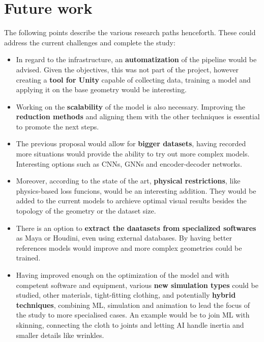 \section*{Future work}
The following points describe the various research paths henceforth. These could address the current challenges and complete the study:
\begin{itemize}
    \item In regard to the infrastructure, an \textbf{automatization} of the pipeline would be advised. Given the objectives, this was not part of the project, however creating a \textbf{tool for Unity} capable of collecting data, training a model and applying it on the base geometry would be interesting.
    \item Working on the \textbf{scalability} of the model is also necessary. Improving the \textbf{reduction methods} and aligning them with the other techniques is essential to promote the next steps.
    \item The previous proposal would allow for \textbf{bigger datasets}, having recorded more situations would provide the ability to try out more complex models. Interesting options such as CNNs, GNNs and encoder-decoder networks.
    \item Moreover, according to the state of the art, \textbf{physical restrictions}, like physics-based loss funcions, would be an interesting addition. They would be added to the current models to archieve optimal visual results besides the topology of the geometry or the dataset size.
    \item There is an option to \textbf{extract the daatasets from specialized softwares} as Maya or Houdini, even using external databases. By having better references models would improve and more complex geometries could be trained.
    \item Having improved enough on the optimization of the model and with competent software and equipment, various \textbf{new simulation types} could be studied, other materials, tight-fitting clothing, and potentially \textbf{hybrid techniques}, combining ML, simulation and animation to lead the focus of the study to more specialised cases. An example would be to join ML with skinning, connecting the cloth to joints and letting AI handle inertia and smaller details like wrinkles.
\end{itemize}